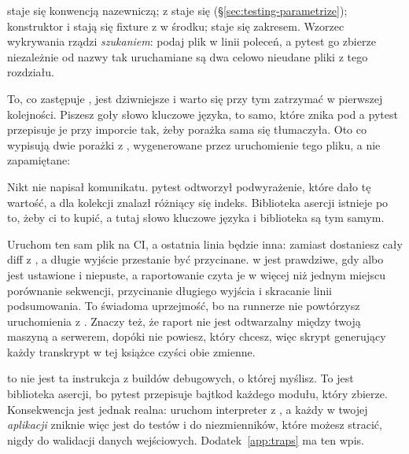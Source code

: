 
\begin{csbox}
\code{[Fact]} staje się konwencją nazewniczą; \code{[Theory]} z
\code{[InlineData]} staje się 
(\S\ref{sec:testing-parametrize}); konstruktor i  stają
się fixture z  w środku;  staje się
zakresem. Wzorzec wykrywania rządzi \emph{szukaniem}: podaj plik w linii
poleceń, a pytest go zbierze niezależnie od nazwy \dash{} tak uruchamiane są
dwa celowo nieudane pliki z tego rozdziału.
\end{csbox}

\noindent
To, co zastępuje , jest dziwniejsze i warto się przy tym
zatrzymać w pierwszej kolejności. Piszesz goły  \dash{} słowo
kluczowe języka, to samo, które znika pod  \dash{} a pytest
przepisuje je przy imporcie tak, żeby porażka sama się tłumaczyła. Oto co
wypisują dwie porażki z , wygenerowane przez
uruchomienie tego pliku, a nie zapamiętane:


\noindent
Nikt nie napisał komunikatu. pytest odtworzył podwyrażenie, które dało tę
wartość, a dla kolekcji znalazł różniący się indeks. Biblioteka asercji
istnieje po to, żeby ci to kupić, a tutaj słowo kluczowe języka i biblioteka
są tym samym.

\begin{warning}
Uruchom ten sam plik na CI, a ostatnia linia będzie inna:
zamiast  dostaniesz cały diff z
, a długie wyjście przestanie być przycinane.
 w  jest prawdziwe, gdy
 albo  jest ustawione i niepuste, a raportowanie
czyta je w więcej niż jednym miejscu \dash{} porównanie sekwencji,
przycinanie długiego wyjścia i skracanie linii podsumowania. To świadoma
uprzejmość, bo na runnerze nie powtórzysz uruchomienia z .
Znaczy też, że raport nie jest odtwarzalny między twoją maszyną a
serwerem, dopóki nie powiesz, który chcesz, więc skrypt generujący każdy
transkrypt w tej książce czyści obie zmienne.
\end{warning}

\begin{trapbox}
 to nie jest ta instrukcja z buildów debugowych, o której
myślisz. To jest biblioteka asercji, bo pytest przepisuje bajtkod każdego
modułu, który zbierze. Konsekwencja jest jednak realna: uruchom interpreter
z , a każdy  w twojej \emph{aplikacji} zniknie \dash{}
więc  jest do testów i do niezmienników, które możesz stracić,
nigdy do walidacji danych wejściowych. Dodatek~\ref{app:traps} ma ten wpis.
\end{trapbox}

